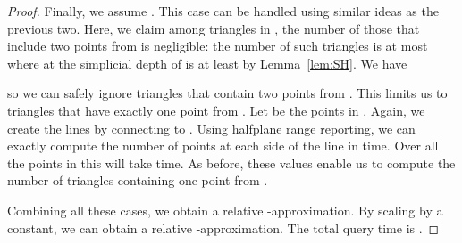 \begin{proof}
	Finally, we assume .
	This case can be handled using similar ideas as the previous two.
	Here,  we claim among triangles in , the number of those that
	include two points from  is negligible: the number of such triangles is at most
	 where at the simplicial depth of  is at least 
	by Lemma~\ref{lem:SH}.
	We have
	
	so we can safely ignore triangles that contain two points from .
	This limits us to triangles that have exactly one point from .
	Let  be the points in .
	Again, we create the lines  by connecting  to .
	Using halfplane range reporting, we can exactly compute the number of points at each side
	of the line  in  time. 
	Over all the points in  this will take  time. 
	As before, these values enable us to compute the number of triangles containing one point from .


	Combining all these cases, we obtain a relative -approximation.
	By scaling  by a constant, we can obtain a relative -approximation.
	The total query time is .
\end{proof}
